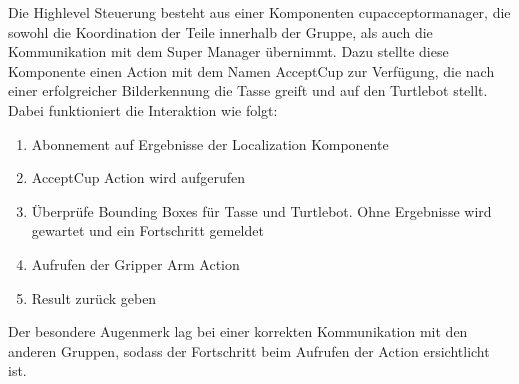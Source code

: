 Die Highlevel Steuerung besteht aus einer Komponenten \glqq cup\textunderscore acceptor\textunderscore manager\grqq, die sowohl die Koordination der Teile innerhalb der Gruppe, als auch die Kommunikation mit dem Super Manager übernimmt. Dazu stellte diese Komponente einen Action mit dem Namen AcceptCup zur Verfügung, die nach einer erfolgreicher Bilderkennung die Tasse greift und auf den Turtlebot stellt. Dabei funktioniert die Interaktion wie folgt:
\begin{enumerate}
\item Abonnement auf Ergebnisse der Localization Komponente
\item AcceptCup Action wird aufgerufen
\item Überprüfe Bounding Boxes für Tasse und Turtlebot. Ohne Ergebnisse wird gewartet und ein Fortschritt gemeldet
\item Aufrufen der Gripper Arm Action
\item Result zurück geben
\end{enumerate}

Der besondere Augenmerk lag bei einer korrekten Kommunikation mit den anderen Gruppen, sodass der Fortschritt beim Aufrufen der Action ersichtlicht ist.
